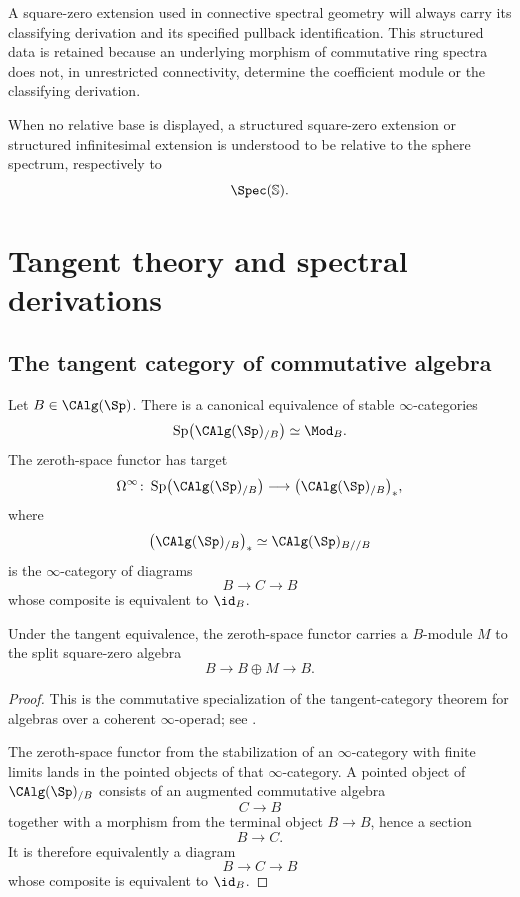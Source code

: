 A square-zero extension used in connective spectral geometry will always
carry its classifying derivation and its specified pullback
identification. This structured data is retained because an underlying
morphism of commutative ring spectra does not, in unrestricted
connectivity, determine the coefficient module or the classifying
derivation.

When no relative base is displayed, a structured square-zero extension
or structured infinitesimal extension is understood to be relative to
the sphere spectrum, respectively to
\[
    \Spec(\mathbb S).
\]

\section{Tangent theory and spectral derivations}
\label{sec:spectral-tangent-derivations}

\subsection{The tangent category of commutative algebra}

\begin{theorem}
\label{thm:tangent-category-calg}
Let \(B\in\CAlg(\Sp)\). There is a canonical equivalence of stable
\(\infty\)-categories
\[
    \operatorname{Sp}
    \bigl(
        \CAlg(\Sp)_{/B}
    \bigr)
    \simeq
    \Mod_B.
\]
The zeroth-space functor has target
\[
    \Omega^\infty
    \colon
    \operatorname{Sp}
    \bigl(
        \CAlg(\Sp)_{/B}
    \bigr)
    \longrightarrow
    \bigl(
        \CAlg(\Sp)_{/B}
    \bigr)_*,
\]
where
\[
    \bigl(
        \CAlg(\Sp)_{/B}
    \bigr)_*
    \simeq
    \CAlg(\Sp)_{B//B}
\]
is the \(\infty\)-category of diagrams
\[
    B
    \longrightarrow
    C
    \longrightarrow
    B
\]
whose composite is equivalent to \(\id_B\).

Under the tangent equivalence, the zeroth-space functor carries a
\(B\)-module \(M\) to the split square-zero algebra
\[
    B
    \longrightarrow
    B\oplus M
    \longrightarrow
    B.
\]
\end{theorem}

\begin{proof}
This is the commutative specialization of the tangent-category theorem
for algebras over a coherent \(\infty\)-operad; see
\cite[Theorem~7.3.4.13, Corollary~7.3.4.14, and
Remark~7.3.4.15]{LurieHigherAlgebra}.

The zeroth-space functor from the stabilization of an
\(\infty\)-category with finite limits lands in the pointed objects of
that \(\infty\)-category. A pointed object of
\(\CAlg(\Sp)_{/B}\) consists of an augmented commutative algebra
\[
    C
    \longrightarrow
    B
\]
together with a morphism from the terminal object \(B\to B\), hence a
section
\[
    B
    \longrightarrow
    C.
\]
It is therefore equivalently a diagram
\[
    B
    \longrightarrow
    C
    \longrightarrow
    B
\]
whose composite is equivalent to \(\id_B\).
\end{proof}

